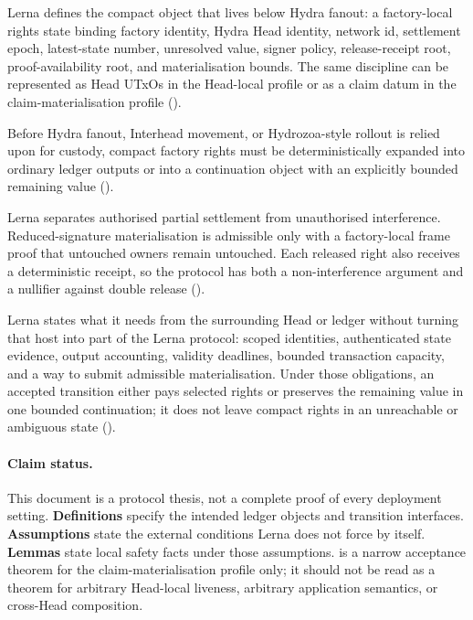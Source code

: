 \documentclass[a4paper,11pt]{article}
\theoremstyle{definition}
\theoremstyle{plain}
\theoremstyle{remark}
\begin{document}
\begin{description}[leftmargin=2.6cm,style=nextline]
\item[C1. Inner factory rights discipline.]
Lerna defines the compact object that lives below Hydra fanout: a factory-local
rights state binding factory identity, Hydra Head identity, network id,
settlement epoch, latest-state number, unresolved value, signer policy,
release-receipt root, proof-availability root, and materialisation bounds.
The same discipline can be represented as Head UTxOs in the Head-local profile
or as a claim datum in the claim-materialisation profile
().

\item[C2. Materialisation before outer fanout or rollout.]
Before Hydra fanout, Interhead movement, or Hydrozoa-style rollout is relied
upon for custody, compact factory rights must be deterministically expanded into
ordinary ledger outputs or into a continuation object with an explicitly bounded
remaining value
().

\item[C3. Factory-local non-interference plus release receipts.]
Lerna separates authorised partial settlement from unauthorised interference.
Reduced-signature materialisation is admissible only with a factory-local frame
proof that untouched owners remain untouched. Each released right also receives
a deterministic receipt, so the protocol has both a non-interference argument
and a nullifier against double release
().

\item[C4. Host-interface and no-stranding obligations.]
Lerna states what it needs from the surrounding Head or ledger without turning
that host into part of the Lerna protocol: scoped identities, authenticated
state evidence, output accounting, validity deadlines, bounded transaction
capacity, and a way to submit admissible materialisation. Under those
obligations, an accepted transition either pays selected rights or preserves the
remaining value in one bounded continuation; it does not leave compact rights in
an unreachable or ambiguous state
().
\end{description}

\paragraph{Claim status.}
This document is a protocol thesis, not a complete proof of every deployment
setting. \textbf{Definitions} specify the intended ledger objects and transition
interfaces. \textbf{Assumptions} state the external conditions Lerna does not
force by itself. \textbf{Lemmas} state local safety facts under those
assumptions. \textbf{} is a narrow
acceptance theorem for the claim-materialisation profile only; it should not be
read as a theorem for arbitrary Head-local liveness, arbitrary application
semantics, or cross-Head composition.
\end{document}
